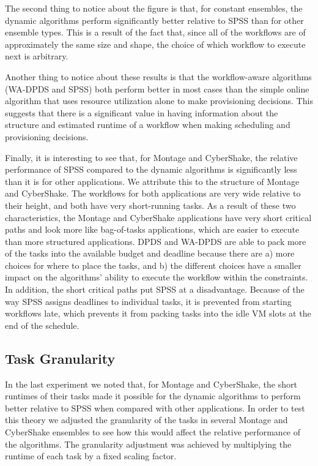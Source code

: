 \documentclass[conference]{IEEEtran}
\begin{document}
The second thing to notice about the figure is that, for constant ensembles, the dynamic algorithms perform significantly better relative to SPSS than for other ensemble types. This is a result of the fact that, since all of the workflows are of approximately the same size and shape, the choice of which workflow to execute next is arbitrary.

Another thing to notice about these results is that the workflow-aware algorithms (WA-DPDS and SPSS) both perform better in most cases than the simple online algorithm that uses resource utilization alone to make provisioning decisions. This suggests that there is a significant value in having information about the structure and estimated runtime of a workflow when making scheduling and provisioning decisions.

Finally, it is interesting to see that, for Montage and CyberShake, the relative performance of SPSS compared to the dynamic algorithms is significantly less than it is for other applications. We attribute this to the structure of Montage and CyberShake. The workflows for both applications are very wide relative to their height, and both have very short-running tasks. As a result of these two characteristics, the Montage and CyberShake applications have very short critical paths and look more like bag-of-tasks applications, which are easier to execute than more structured applications. DPDS and WA-DPDS are able to pack more of the tasks into the available budget and deadline because there are a) more choices for where to place the tasks, and b) the different choices have a smaller impact on the algorithms' ability to execute the workflow within the constraints. In addition, the short critical paths put SPSS at a disadvantage. Because of the way SPSS assigns deadlines to individual tasks, it is prevented from starting workflows late, which prevents it from packing tasks into the idle VM slots at the end of the schedule.


\subsection{Task Granularity}

In the last experiment we noted that, for Montage and CyberShake, the short runtimes of their tasks made it possible for the dynamic algorithms to perform better relative to SPSS when compared with other applications. In order to test this theory we adjusted the granularity of the tasks in several Montage and CyberShake ensembles to see how this would affect the relative performance of the algorithms. The granularity adjustment was achieved by multiplying the runtime of each task by a fixed scaling factor.
\end{document}
